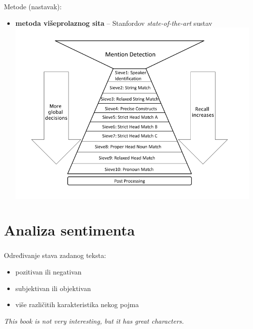 \documentclass[t, xcolor={usenames,dvipsnames,svgnames,table}]{beamer}
\begin{document}
	\begin{frame}
		\frametitle{\secname}
		
		Metode (nastavak):
		\begin{itemize}
			\item 	\textbf{metoda višeprolaznog sita} -- Stanfordov \textit{state-of-the-art} sustav \\
				\includegraphics[scale = 0.4]{sieve.png}
			
		\end{itemize}
		
	\end{frame}


\section{Analiza sentimenta}
	
	\begin{frame}
		\sectionpage
	\end{frame}

	\begin{frame}
		\frametitle{\secname}
		
		Određivanje stava zadanog teksta:
		\begin{itemize}
			\item	pozitivan ili negativan
			\item 	subjektivan ili objektivan
			\item 	više različitih karakteristika nekog pojma
		\end{itemize}
		
		\bigskip
		
		\begin{displayquote}
			\textit{This book is not very interesting, but it has great characters.}
		\end{displayquote}
	\end{frame}
	
\end{document}
